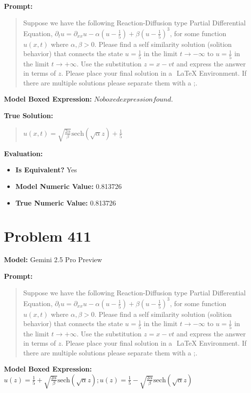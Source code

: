 \documentclass{article}
\begin{document}
\textbf{Prompt:}
\begin{quote}
Suppose we have the following Reaction-Diffusion type Partial Differential Equation, $ \partial_t u = \partial_{xx} u - \alpha (u - \frac{1}{5}) + \beta (u - \frac{1}{5})^3 $, for some function $u(x,t)$ where $\alpha,\beta > 0$. Please find a self similarity solution (solition behavior) that connects the state $u = \frac{1}{5}$ in the limit $t \rightarrow -\infty $ to $u = \frac{1}{5}$ in the limit $t \rightarrow +\infty$. Use the substitution $z=x-vt$ and express the answer in terms of $z$. Please place your final solution in a $\boxed{}$ LaTeX Environment. If there are multiple solutions please separate them with a ;.
\end{quote}
\textbf{Model Boxed Expression:} $No boxed expression found.$

\textbf{True Solution:}
\begin{quote}
$u(x,t) = \sqrt{\frac{2 \alpha}{\beta}}\text{sech}(\sqrt{\alpha} z) + \frac{1}{5}$
\end{quote}

\textbf{Evaluation:}
\begin{itemize}
\item \textbf{Is Equivalent?} Yes
\item \textbf{Model Numeric Value:} 0.813726
\item \textbf{True Numeric Value:} 0.813726
\end{itemize}
\vspace{1cm}
\section*{Problem 411}
\textbf{Model:} Gemini 2.5 Pro Preview

\textbf{Prompt:}
\begin{quote}
Suppose we have the following Reaction-Diffusion type Partial Differential Equation, $ \partial_t u = \partial_{xx} u - \alpha (u - \frac{1}{5}) + \beta (u - \frac{1}{5})^3 $, for some function $u(x,t)$ where $\alpha,\beta > 0$. Please find a self similarity solution (solition behavior) that connects the state $u = \frac{1}{5}$ in the limit $t \rightarrow -\infty $ to $u = \frac{1}{5}$ in the limit $t \rightarrow +\infty$. Use the substitution $z=x-vt$ and express the answer in terms of $z$. Please place your final solution in a $\boxed{}$ LaTeX Environment. If there are multiple solutions please separate them with a ;.
\end{quote}
\textbf{Model Boxed Expression:} $u(z) = \frac{1}{5} + \sqrt{\frac{2\alpha}{\beta}} \text{sech}(\sqrt{\alpha} z) ; u(z) = \frac{1}{5} - \sqrt{\frac{2\alpha}{\beta}} \text{sech}(\sqrt{\alpha} z)$
\end{document}
